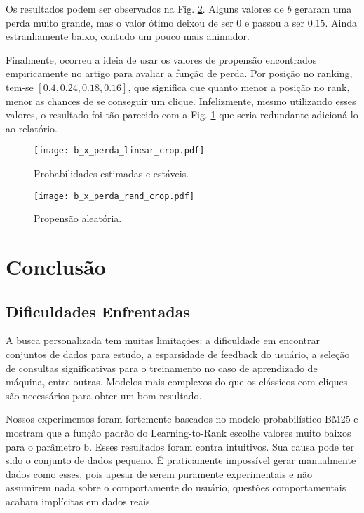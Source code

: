 \documentclass{svproc}
\begin{document}
Os resultados podem ser observados na Fig. \ref{graf:rand}. Alguns valores de $b$ geraram uma perda muito grande, mas o 
valor ótimo deixou de ser $0$ e passou a ser $0.15$. Ainda estranhamente baixo, contudo um pouco mais animador.

Finalmente, ocorreu a ideia de usar os valores de propensão encontrados empiricamente no artigo para avaliar a função
de perda. Por posição no ranking, tem-se $[0.4, 0.24, 0.18, 0.16]$, que significa que quanto menor a posição no rank,
menor as chances de se conseguir um clique. Infelizmente, mesmo utilizando esses valores, o resultado foi tão parecido com 
a Fig. \ref{graf:linear} que seria redundante adicioná-lo ao relatório.

\begin{figure}[ht]
  \caption{Probabilidades estimadas e estáveis.}
  \label{graf:linear}
  \centering
  \texttt{[image: b\_x\_perda\_linear\_crop.pdf]}
\end{figure}

\begin{figure}[ht]
  \caption{Propensão aleatória.}
  \label{graf:rand}
  \centering
  \texttt{[image: b\_x\_perda\_rand\_crop.pdf]}
\end{figure}

\pagebreak


\section{Conclusão}
\subsection{Dificuldades Enfrentadas}
A busca personalizada tem muitas limitações: a dificuldade em encontrar conjuntos de dados para estudo, a
esparsidade de feedback do usuário, a seleção de consultas significativas para o treinamento no caso de aprendizado
de máquina, entre outras. Modelos mais complexos do que os clássicos com cliques são necessários para obter um bom resultado.

Nossos experimentos foram fortemente baseados no modelo probabilístico BM25 e mostram que a função padrão do Learning-to-Rank
escolhe valores muito baixos para o parâmetro b. Esses resultados foram contra intuitivos. Sua causa pode ter sido o conjunto
de dados pequeno. É praticamente impossível gerar manualmente dados como esses, pois apesar de serem puramente experimentais e
não assumirem nada sobre o comportamente do usuário, questões comportamentais acabam implícitas em dados reais.
\end{document}
